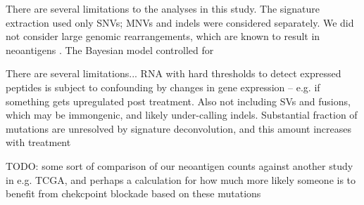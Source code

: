There are several limitations to the analyses in this study. The signature extraction used only SNVs; MNVs and indels were considered separately. We did not consider large genomic rearrangements, which are known to result in neoantigens \cite{Worley2001}. The Bayesian model controlled for 

There are several limitations... RNA with hard thresholds to detect expressed peptides is subject to confounding by changes in gene expression -- e.g. if something gets upregulated post treatment. Also not including SVs and fusions, which may be immongenic, and likely under-calling indels. Substantial fraction of mutations are unresolved by signature deconvolution, and this amount increases with treatment

TODO: some sort of comparison of our neoantigen counts against another study in e.g. TCGA, and perhaps a calculation for how much more likely someone is to benefit from chekcpoint blockade based on these mutations


